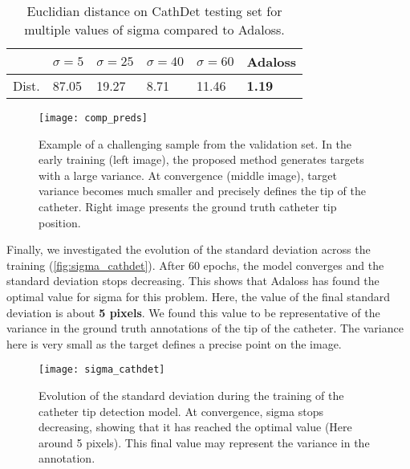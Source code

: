 \documentclass[10pt,twocolumn,letterpaper]{article}
\begin{document}
\begin{center}
  \begin{table}[t]
    \centering
  \begin{tabular}{|l|l|l|l|l|l|}
    \hline
    & $\sigma=5$ & $\sigma=25$ & $\sigma=40$ & $\sigma=60$ & Adaloss\\
    \hline
    Dist. & 87.05 & 19.27 & 8.71 & 11.46 & \textbf{1.19}\\
    \hline
  \end{tabular}
  \caption{Euclidian distance on CathDet testing set for multiple values
  of sigma compared to Adaloss.}
  \label{table:comp_acc_cathdet}
  \end{table}
\end{center}
\begin{figure}[h!]
  \begin{center}
	\texttt{[image: comp\_preds]}
	\caption{Example of a challenging sample from the validation
          set. In the early training (left image), the proposed method
          generates targets with a large variance. At convergence (middle image), target variance
          becomes much smaller and precisely defines the tip of the catheter.
          Right image presents the ground truth catheter tip position.}
	\label{fig:comp_preds}
  \end{center}
\end{figure}

Finally, we investigated the evolution of the standard deviation across 
the training (\autoref{fig:sigma_cathdet}). After 60 epochs, the model
converges and the standard deviation stops decreasing. This shows that
Adaloss has found the optimal value for sigma for this problem. Here,
the value of the final standard deviation is about \textbf{5 pixels}. We
found this value to be representative of the variance in the ground
truth annotations of the tip of the catheter. The variance here is
very small as the target defines a precise point on the image.

\begin{figure}[h]
  \begin{center}
    \centering
	\texttt{[image: sigma\_cathdet]}
	\caption{Evolution of the standard deviation during the training of the
	catheter tip detection model. At convergence, sigma stops decreasing, 
	showing that it has reached the optimal value (Here around 5 pixels).
	This final value may represent the variance in the annotation.}
	\label{fig:sigma_cathdet}
  \end{center}
\end{figure}
\end{document}
